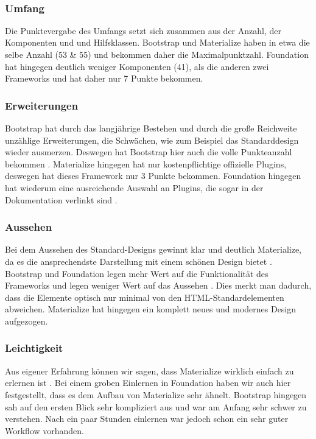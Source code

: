 \label{tbl:comparison}~\\
\subsubsection{Umfang}
Die Punktevergabe des Umfangs setzt sich zusammen aus der Anzahl, der Komponenten und und Hilfsklassen. Bootstrap und Materialize haben in etwa die selbe Anzahl (53 \& 55) und bekommen daher die Maximalpunktzahl\cite{bootstrap-docu,materialize-docu,foundation-docu}. Foundation hat hingegen deutlich weniger Komponenten (41), als die anderen zwei Frameworks und hat daher nur 7 Punkte bekommen.
\subsubsection{Erweiterungen}
Bootstrap hat durch das langjährige Bestehen und durch die große Reichweite unzählige Erweiterungen, die Schwächen, wie zum Beispiel das Standarddesign wieder ausmerzen. Deswegen hat Bootstrap hier auch die volle Punkteanzahl bekommen \cite{introduction-bootstrap}. Materialize hingegen hat nur kostenpflichtige offizielle Plugins, deswegen hat dieses Framework nur 3 Punkte bekommen. Foundation hingegen hat wiederum eine ausreichende Auswahl an Plugins, die sogar in der Dokumentation verlinkt sind \cite{foundation-docu}. 
\subsubsection{Aussehen}
Bei dem Aussehen des Standard-Designs gewinnt klar und deutlich Materialize, da es die ansprechendste Darstellung mit einem schönen Design bietet \cite{materialize-docu}. Bootstrap und Foundation legen mehr Wert auf die Funktionalität des Frameworks und legen weniger Wert auf das Aussehen \cite{bootstrap-docu, foundation-docu}. Dies merkt man dadurch, dass die Elemente optisch nur minimal von den HTML-Standardelementen abweichen. Materialize hat hingegen ein komplett neues und modernes Design aufgezogen.
\subsubsection{Leichtigkeit}
Aus eigener Erfahrung können wir sagen, dass Materialize wirklich einfach zu erlernen ist \cite{materialize-docu}. Bei einem groben Einlernen in Foundation haben wir auch hier festgestellt, dass es dem Aufbau von Materialize sehr ähnelt. Bootstrap hingegen sah auf den ersten Blick sehr kompliziert aus und war am Anfang sehr schwer zu verstehen. Nach ein paar Stunden einlernen war jedoch schon ein sehr guter Workflow vorhanden.

